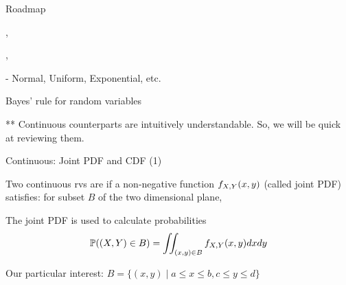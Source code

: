 \documentclass[handout,fleqn,aspectratio=169]{beamer}
\begin{document}
\begin{frame}{Roadmap}

\plitemsep 0.05in

\bci [$\circ$]
\item {}

\item {}

\item {},  

\item {},  

\item {}

- Normal, Uniform, Exponential, etc. 

\item Bayes' rule for random variables

\eci 

\medskip

** Continuous counterparts are intuitively understandable. So, we will be quick at reviewing them.

\end{frame}

\begin{frame}{Continuous: Joint PDF and CDF (1)}

{
Two continuous rvs are  if a non-negative function $f_{X,Y}(x,y)$ (called joint PDF) satisfies: for  subset $B$ of the two dimensional plane,
\vspace{-0.3cm}
}

\plitemsep 0.1in
\bce 
\item<3-> The joint PDF is used to calculate probabilities  
$$\mathbb{P}( (X,Y) \in B ) = \iint_{(x,y) \in B} f_{X,Y}(x,y) dx dy$$

Our particular interest: $B = \{(x,y) \mid a \le x \le b, c \le y \le d \}$
\ece

\end{frame}
\end{document}
